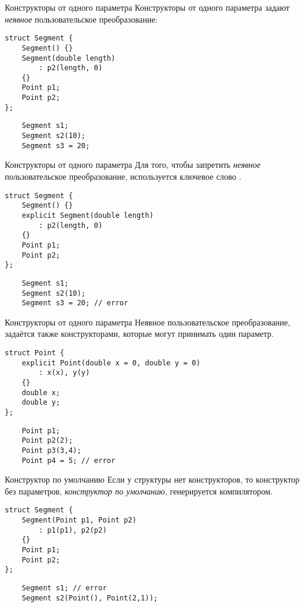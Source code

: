 \documentclass{beamer}
\begin{document}
\begin{frame}[fragile]{Конструкторы от одного параметра}
    Конструкторы от одного параметра задают {\em неявное}
    пользовательское преобразование:
\begin{lstlisting}
struct Segment {
    Segment() {}
    Segment(double length) 
        : p2(length, 0)
    {}
    Point p1;
    Point p2;
};
\end{lstlisting}
\begin{lstlisting}
    Segment s1;
    Segment s2(10);
    Segment s3 = 20;
\end{lstlisting}
\end{frame}

\begin{frame}[fragile]{Конструкторы от одного параметра}
    Для того, чтобы запретить {\em неявное} пользовательское
преобразование, используется ключевое слово .
\begin{lstlisting}
struct Segment {
    Segment() {}
    explicit Segment(double length) 
        : p2(length, 0)
    {}
    Point p1;
    Point p2;
};
\end{lstlisting}
\begin{lstlisting}
    Segment s1;
    Segment s2(10);
    Segment s3 = 20; // error
\end{lstlisting}
\end{frame}

\begin{frame}[fragile]{Конструкторы от одного параметра}
Неявное пользовательское преобразование, 
задаётся также конструкторами, которые могут принимать один параметр.
\begin{lstlisting}
struct Point {
    explicit Point(double x = 0, double y = 0) 
        : x(x), y(y)
    {}
    double x;
    double y;
};
\end{lstlisting}
\begin{lstlisting}
    Point p1;
    Point p2(2);
    Point p3(3,4);
    Point p4 = 5; // error
\end{lstlisting}
\end{frame}

\begin{frame}[fragile]{Конструктор по умолчанию}
    Если у структуры нет конструкторов, то конструктор 
    без параметров, {\em конструктор по умолчанию},
    генерируется компилятором.
\begin{lstlisting}
struct Segment {
    Segment(Point p1, Point p2) 
        : p1(p1), p2(p2)
    {}
    Point p1;
    Point p2;
};
\end{lstlisting}
\begin{lstlisting}
    Segment s1; // error
    Segment s2(Point(), Point(2,1));
\end{lstlisting}
\end{frame}
\end{document}
